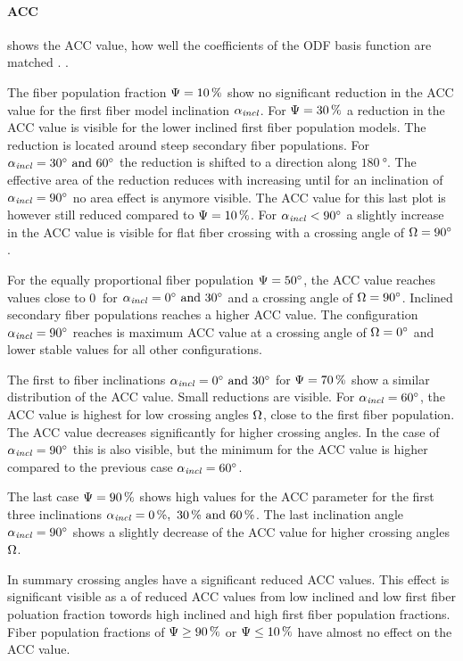 \paragraph{\acs{ACC}}
 shows the  \ac{ACC} value, \ie{} how well the coefficients of the \ac{ODF} basis function are matched \cite{Schilling2018}.
.
\par
% 
The fiber population fraction $\textnormal{$\Psi$}=\SI{10}{\percent}$ show no significant reduction in the \ac{ACC} value for the first fiber model inclination $\textnormal{$\alpha_{\mathit{incl}}$}$.
For $\textnormal{$\Psi$}=\SI{30}{\percent}$ a reduction in the \ac{ACC} value is visible for the lower inclined first fiber population models.
The reduction is located around steep secondary fiber populations.
For $\modelInc = \SIlist{30;60}{\degree}$ the reduction is shifted to a direction along $\SI{180}{\degree}$.
The effective area of the reduction reduces with increasing \modelInc{} until for an inclination of $\textnormal{$\alpha_{\mathit{incl}}$}=\SI{90}{\degree}$ no area effect is anymore visible.
The \ac{ACC} value for this last plot is however still reduced compared to $\textnormal{$\Psi$}=\SI{10}{\percent}$.
For $\textnormal{$\alpha_{\mathit{incl}}$} < \SI{90}{\degree}$ a slightly increase in the \ac{ACC} value is visible for flat fiber crossing with a crossing angle of $\textnormal{$\Omega$}=\SI{90}{\degree}$.
\par
%
For the equally proportional fiber population $\textnormal{$\Psi$} = \SI{50}{\degree}$, the \ac{ACC} value reaches values close to $\SI{0}{}$ for $\modelInc = \SIlist{0;30}{\degree}$ and a crossing angle of $\textnormal{$\Omega$}=\SI{90}{\degree}$.
Inclined secondary fiber populations reaches a higher \ac{ACC} value.
The configuration $\textnormal{$\alpha_{\mathit{incl}}$} = \SI{90}{\degree}$ reaches is maximum \ac{ACC} value at a crossing angle of $\textnormal{$\Omega$}=\SI{0}{\degree}$ and lower stable values for all other configurations.
\par
%
The first to fiber inclinations $\modelInc = \SIlist{0;30}{\degree}$ for $\textnormal{$\Psi$}=\SI{70}{\percent}$ show a similar distribution of the \ac{ACC} value. 
Small reductions are visible.
For $\textnormal{$\alpha_{\mathit{incl}}$}=\SI{60}{\degree}$, the \ac{ACC} value is highest for low crossing angles $\textnormal{$\Omega$}$, \ie{} close to the first fiber population.
The \ac{ACC} value decreases significantly for higher crossing angles.
In the case of $\textnormal{$\alpha_{\mathit{incl}}$}=\SI{90}{\degree}$ this is also visible, but the minimum for the \ac{ACC} value is higher compared to the previous case $\textnormal{$\alpha_{\mathit{incl}}$}=\SI{60}{\degree}$.
\par
%
The last case $\textnormal{$\Psi$}=\SI{90}{\percent}$ shows high values for the \ac{ACC} parameter for the first three inclinations $\modelInc=\SIlist{0;30;60}{\percent}$.
The last inclination angle $\textnormal{$\alpha_{\mathit{incl}}$}=\SI{90}{\degree}$ shows a slightly decrease of the \ac{ACC} value for higher crossing angles $\textnormal{$\Omega$}$.
\par
%
In summary crossing angles have a significant reduced \ac{ACC} values.
This effect is significant visible as a  of reduced \ac{ACC} values from low inclined and low first fiber poluation fraction towords high inclined and high first fiber population fractions.
Fiber population fractions of $\textnormal{$\Psi$} \geq \SI{90}{\percent}$ or $\textnormal{$\Psi$} \leq \SI{10}{\percent}$ have almost no effect on the \ac{ACC} value.
%
